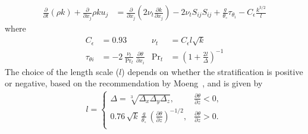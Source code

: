 \begin{align}
  \frac{\partial}{\partial t}\left(\rho k \right) + \frac{\partial}{\partial x_j} \rho k {u_j} &= \frac{\partial}{\partial x_j} \left (2 \nu_t \frac{\partial k}{\partial x_j} \right) - 2 \nu_t {S_{ij}} {S_{ij}} + \frac{g}{\theta_\circ} \tau_{\theta_i} - C_{\epsilon} \frac{k^{3/2}}{l} \label{eqn:ksgs-les}
\end{align}
where
\begin{align*}
  C_\epsilon &= 0.93 & \nu_t &= C_\epsilon l \sqrt{k} \\
  \tau_{\theta i} &= - 2\ \frac{\nu_t}{\mathrm{Pr}_t}\ \frac{\partial {\theta}}{\partial x_i} & \mathrm{Pr}_t &= \left( 1 + \frac{2l}{\Delta} \right)^{-1}
\end{align*}
The choice of the length scale ($l$) depends on whether the stratification is positive
or negative, based on the recommendation by Moeng~\cite{Moeng1984}, and is given
by
\begin{align}
  l =
  \begin{cases}
    \Delta = \sqrt[3]{\Delta_x \Delta_y \Delta_z}, & \frac{\partial {\theta}}{\partial z} < 0 , \\
    0.76\, \sqrt{k}\, \frac{g}{\theta_\circ}\, \left( \frac{\partial {\theta}}{\partial z}\right)^{-1/2}, &  \frac{\partial {\theta}}{\partial z} > 0 .\\
  \end{cases}
\end{align}

